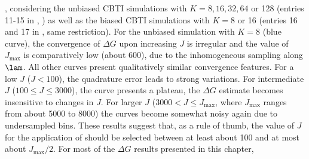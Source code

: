 ,
considering the unbiased CBTI simulations with $K=8,16,32,64$ or 128 
(entries 11-15 in , )
as well as the biased CBTI simulations with $K=8$ or 16 (entries 16 and 17 in , same restriction). 
%
For the unbiased simulation with $K=8$ (blue curve), the convergence of $\Delta G$ upon increasing $J$
is irregular and the value of $J_{\mathrm{max}}$ is comparatively low (about 600),
due to the inhomogeneous sampling along $\lam$. All other curves present qualitatively similar convergence
features. For a low $J$ ($J<100$), the quadrature error leads to strong variations.
For intermediate $J$ ($100\leq J \leq 3000$), the curve presents a plateau, \ie{} 
the $\Delta G$ estimate becomes insensitive to changes in $J$.
For larger $J$ ($3000< J \leq J_{\mathrm{max}}$, where $J_{\mathrm{max}}$ ranges from about 5000 to 8000)
the curves become somewhat noisy again due to undersampled bins.
%
These results suggest that, as a rule of thumb, the value of $J$ for the application 
of  should be selected between at least about 100 and at most about $J_{\mathrm{max}}/2$.
For most of the $\Delta G$ results presented in this chapter, 
%
%


